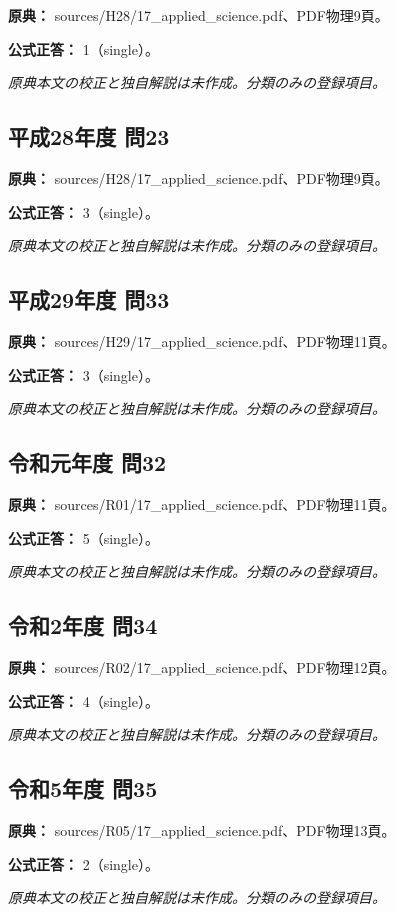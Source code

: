 \noindent\textbf{原典：} sources/H28/17\_applied\_science.pdf、PDF物理9頁。

\textbf{公式正答：} 1（single）。

\par\textit{原典本文の校正と独自解説は未作成。分類のみの登録項目。}

\subsection{平成28年度 問23}
\label{q:h28-reg-applied-23}

\noindent\textbf{原典：} sources/H28/17\_applied\_science.pdf、PDF物理9頁。

\textbf{公式正答：} 3（single）。

\par\textit{原典本文の校正と独自解説は未作成。分類のみの登録項目。}

\subsection{平成29年度 問33}
\label{q:h29-reg-applied-33}

\noindent\textbf{原典：} sources/H29/17\_applied\_science.pdf、PDF物理11頁。

\textbf{公式正答：} 3（single）。

\par\textit{原典本文の校正と独自解説は未作成。分類のみの登録項目。}

\subsection{令和元年度 問32}
\label{q:r01-reg-applied-32}

\noindent\textbf{原典：} sources/R01/17\_applied\_science.pdf、PDF物理11頁。

\textbf{公式正答：} 5（single）。

\par\textit{原典本文の校正と独自解説は未作成。分類のみの登録項目。}

\subsection{令和2年度 問34}
\label{q:r02-reg-applied-34}

\noindent\textbf{原典：} sources/R02/17\_applied\_science.pdf、PDF物理12頁。

\textbf{公式正答：} 4（single）。

\par\textit{原典本文の校正と独自解説は未作成。分類のみの登録項目。}

\subsection{令和5年度 問35}
\label{q:r05-reg-applied-35}

\noindent\textbf{原典：} sources/R05/17\_applied\_science.pdf、PDF物理13頁。

\textbf{公式正答：} 2（single）。

\par\textit{原典本文の校正と独自解説は未作成。分類のみの登録項目。}
